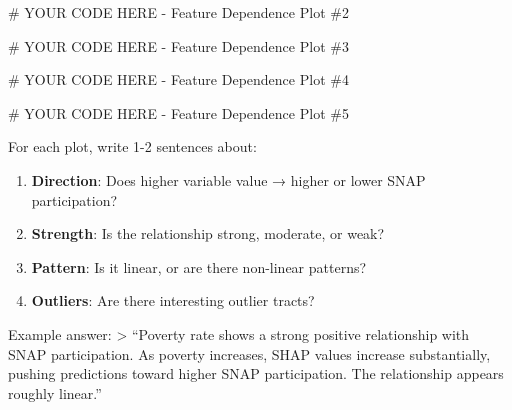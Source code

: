 \documentclass[
  letterpaper,
  DIV=11,
  numbers=noendperiod]{scrartcl}
\newenvironment{Shaded}{\begin{snugshade}}{\end{snugshade}}
\newcommand{\CommentTok}[1]{\textcolor[rgb]{0.37,0.37,0.37}{#1}}
\providecommand{\tightlist}{%
  \setlength{\itemsep}{0pt}\setlength{\parskip}{0pt}}\usepackage{longtable,booktabs,array}
\begin{document}
\begin{Shaded}
\begin{Highlighting}[]
\CommentTok{\# YOUR CODE HERE {-} Feature Dependence Plot \#2}
\end{Highlighting}
\end{Shaded}

\begin{Shaded}
\begin{Highlighting}[]
\CommentTok{\# YOUR CODE HERE {-} Feature Dependence Plot \#3}
\end{Highlighting}
\end{Shaded}

\begin{Shaded}
\begin{Highlighting}[]
\CommentTok{\# YOUR CODE HERE {-} Feature Dependence Plot \#4}
\end{Highlighting}
\end{Shaded}

\begin{Shaded}
\begin{Highlighting}[]
\CommentTok{\# YOUR CODE HERE {-} Feature Dependence Plot \#5}
\end{Highlighting}
\end{Shaded}

\begin{tcolorbox}[enhanced jigsaw, title=\textcolor{quarto-callout-note-color}{\faInfo}\hspace{0.5em}{📊 Dependence Analysis Questions}, titlerule=0mm, coltitle=black, colbacktitle=quarto-callout-note-color!10!white, colback=white, left=2mm, toprule=.15mm, opacitybacktitle=0.6, toptitle=1mm, colframe=quarto-callout-note-color-frame, bottomtitle=1mm, arc=.35mm, bottomrule=.15mm, breakable, leftrule=.75mm, opacityback=0, rightrule=.15mm]

For each plot, write 1-2 sentences about:

\begin{enumerate}
\def\labelenumi{\arabic{enumi}.}
\tightlist
\item
  \textbf{Direction}: Does higher variable value → higher or lower SNAP
  participation?
\item
  \textbf{Strength}: Is the relationship strong, moderate, or weak?
\item
  \textbf{Pattern}: Is it linear, or are there non-linear patterns?
\item
  \textbf{Outliers}: Are there interesting outlier tracts?
\end{enumerate}

Example answer: \textgreater{} ``Poverty rate shows a strong positive
relationship with SNAP participation. As poverty increases, SHAP values
increase substantially, pushing predictions toward higher SNAP
participation. The relationship appears roughly linear.''

\end{tcolorbox}
\end{document}
